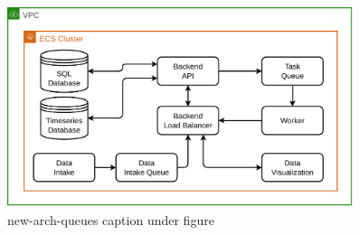 \begin{figure}[!htbp]
    \centering
    \includegraphics[width=0.90\textwidth]{img/diagrams/pdf/new-arch-queues.drawio.pdf}
    \caption[new-arch-queues listing]{new-arch-queues caption under figure}
    \label{fig:new-arch-queues}
\end{figure}
